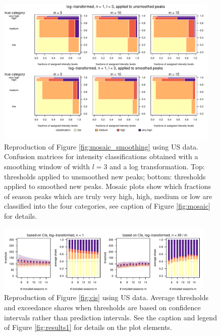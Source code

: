 \documentclass{article}
\begin{document}
\begin{figure}
\includegraphics[width=0.95\textwidth]{figure/mosaic_log_smoothed_us.pdf}
\caption{Reproduction of Figure \ref{fig:mosaic_smoothing} using US data. Confusion matrices for intensity classifications obtained with a smoothing window of width $l = 3$ and a log transformation. Top: thresholds applied to unsmoothed new peaks; bottom: thresholds applied to smoothed new peaks. Mosaic plots show which fractions of season peaks which are truly very high, high, medium or low are classified into the four categories, see caption of Figure \ref{fig:mosaic} for details.}
\label{fig:mosaic_smoothing_us}
\end{figure}


\begin{figure}
\includegraphics[width=0.93\textwidth]{figure/plot_ci_us.pdf}
\caption{Reproduction of Figure \ref{fig:cis} using US data. Average thresholds and exceedance shares when thresholds are based on confidence intervals rather than prediction intervals. See the caption and legend of Figure \ref{fig:results1} for details on the plot elements.}
\label{fig:cis_us}
\end{figure}

\newpage
\end{document}
